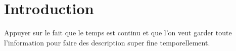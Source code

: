 
\chapter*{Introduction}

Appuyer sur le fait que le temps est continu et que l'on veut garder toute l'information pour faire des description super fine temporellement.

